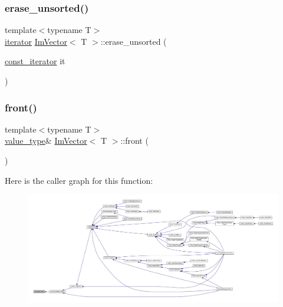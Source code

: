 \mbox{\label{class_im_vector_a0948ac4ab740ea42c6cd11a279a4b9a6}} 
\subsubsection{\texorpdfstring{erase\+\_\+unsorted()}{erase\_unsorted()}}
{\footnotesize\ttfamily template$<$typename T$>$ \\
\mbox{\hyperlink{class_im_vector_a74b5478f1f6fd471cc71219bce483db6}{iterator}} \mbox{\hyperlink{class_im_vector}{Im\+Vector}}$<$ T $>$\+::erase\+\_\+unsorted (\begin{DoxyParamCaption}\item[{\mbox{\hyperlink{class_im_vector_aedeac9c5080f9d6ce96ae837768ee4c4}{const\+\_\+iterator}}}]{it }\end{DoxyParamCaption})\hspace{0.3cm}{\ttfamily [inline]}}

\mbox{\label{class_im_vector_a5b0108d6b1a4a11609723f8305fb9011}} 
\subsubsection{\texorpdfstring{front()}{front()}\hspace{0.1cm}{\footnotesize\ttfamily [1/2]}}
{\footnotesize\ttfamily template$<$typename T$>$ \\
\mbox{\hyperlink{class_im_vector_a8bd77e4e7581d8e5f9e98d7c2f3c2a80}{value\+\_\+type}}\& \mbox{\hyperlink{class_im_vector}{Im\+Vector}}$<$ T $>$\+::front (\begin{DoxyParamCaption}{ }\end{DoxyParamCaption})\hspace{0.3cm}{\ttfamily [inline]}}

Here is the caller graph for this function\+:
\nopagebreak
\begin{figure}[H]
\begin{center}
\leavevmode
\includegraphics[width=350pt]{class_im_vector_a5b0108d6b1a4a11609723f8305fb9011_icgraph}
\end{center}
\end{figure}
\mbox{\label{class_im_vector_a76dc6bb045574ba79b15a1941b662597}} 
